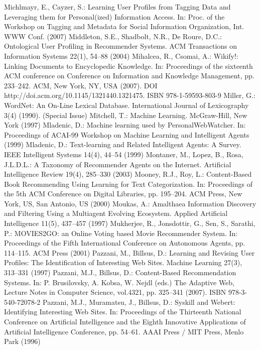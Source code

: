 \begin{thebibliography}{99}
Michlmayr, E., Cayzer, S.: Learning User Profiles from Tagging Data and Leveraging them for Personal(ized) Information Access. In: Proc. of the Workshop on Tagging and Metadata for Social Information Organization, Int. WWW Conf. (2007)
Middleton, S.E., Shadbolt, N.R., De Roure, D.C.: Ontological User Profiling in Recommender Systems. ACM Transactions on Information Systems 22(1), 54–88 (2004)
Mihalcea, R., Csomai, A.: Wikify!: Linking Documents to Encyclopedic Knowledge. In: Proceedings of the sixteenth ACM conference on Conference on Information and Knowledge Management, pp. 233–242. ACM, New York, NY, USA (2007). DOI http://doi.acm.org/10.1145/1321440.1321475. ISBN 978-1-59593-803-9
Miller, G.: WordNet: An On-Line Lexical Database. International Journal of Lexicography 3(4) (1990). (Special Issue)
Mitchell, T.: Machine Learning. McGraw-Hill, New York (1997)
Mladenic, D.: Machine learning used by PersonalWebWatcher. In: Proceedings of ACAI-99 Workshop on Machine Learning and Intelligent Agents (1999)
Mladenic, D.: Text-learning and Related Intelligent Agents: A Survey. IEEE Intelligent Systems 14(4), 44–54 (1999)
Montaner, M., Lopez, B., Rosa, J.L.D.L.: A Taxonomy of Recommender Agents on the Internet. Artificial Intelligence Review 19(4), 285–330 (2003)
Mooney, R.J., Roy, L.: Content-Based Book Recommending Using Learning for Text Categorization. In: Proceedings of the 5th ACM Conference on Digital Libraries, pp. 195–204. ACM Press, New York, US, San Antonio, US (2000)
Moukas, A.: Amalthaea Information Discovery and Filtering Using a Multiagent Evolving Ecosystem. Applied Artificial Intelligence 11(5), 437–457 (1997)
Mukherjee, R., Jonsdottir, G., Sen, S., Sarathi, P.: MOVIES2GO: an Online Voting based Movie Recommender System. In: Proceedings of the Fifth International Conference on Autonomous Agents, pp. 114–115. ACM Press (2001)
Pazzani, M., Billsus, D.: Learning and Revising User Profiles: The Identification of Interesting Web Sites. Machine Learning 27(3), 313–331 (1997)
Pazzani, M.J., Billsus, D.: Content-Based Recommendation Systems. In: P. Brusilovsky, A. Kobsa, W. Nejdl (eds.) The Adaptive Web, Lecture Notes in Computer Science, vol.4321, pp. 325–341 (2007). ISBN 978-3-540-72078-2
Pazzani, M.J., Muramatsu, J., Billsus, D.: Syskill and Webert: Identifying Interesting Web Sites. In: Proceedings of the Thirteenth National Conference on Artificial Intelligence and the Eighth Innovative Applications of Artificial Intelligence Conference, pp. 54–61. AAAI Press / MIT Press, Menlo Park (1996)

\end{thebibliography}
